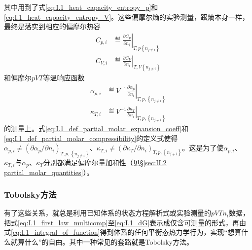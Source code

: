 \documentclass[main.tex]{subfiles}
\begin{document}
其中用到了式\eqref{eq:I.1_heat_capacity_entropy_p}和\eqref{eq:I.1_heat_capacity_entropy_V}。这些偏摩尔熵的实验测量，跟熵本身一样，最终是落实到相应的偏摩尔热容
\begin{align}
    C_{p,i} & \eqdef\left.\frac{\partial C_p}{\partial n_i}\right|_{T,p\left\{n_{j\neq i}\right\}} \label{eq:I.1_def_Cpi} \\
    C_{V,i} & \eqdef\left.\frac{\partial C_V}{\partial n_i}\right|_{T,V\left\{n_{j\neq i}\right\}}\label{eq:I.1_def_CVi}
\end{align}
和偏摩尔$pVT$等温响应函数
\begin{align}
    \alpha_{p,i} & \eqdef V^{-1}\left.\frac{\partial \alpha_p}{\partial n_i}\right|_{T,p,\left\{n_{j\neq i}\right\}}\label{eq:I.1_def_partial_molar_expansion_coeff} \\
    \kappa_{T,i} & \eqdef V^{-1}\left.\frac{\partial \kappa_T}{\partial n_i}\right|_{T,p,\left\{n_{j\neq i}\right\}}\label{eq:I.1_def_partial_molar_compressibility}
\end{align}
的测量上。式\eqref{eq:I.1_def_partial_molar_expansion_coeff}和\eqref{eq:I.1_def_partial_molar_compressibility}的定义式使得$\alpha_{p,i}\neq\left(\partial\alpha_p/\partial n_i\right)_{T,p,\left\{n_{j\neq i}\right\}}$、$\kappa_{T,i}\neq\left(\partial\kappa_T/\partial n_i\right)_{T,p,\left\{n_{j\neq i}\right\}}$。这是为了使$\alpha_{p,i}$、$\kappa_{T,i}$与$\alpha_p$、$\kappa_T$分别都满足偏摩尔量加和性（见\S\ref{sec:II.2 partial_molar_quantities}）。

\subsubsection{Tobolsky方法}
有了这些关系，就总是利用已知体系的状态方程解析式或实验测量的$pVTn_i$数据，把式\eqref{eq:I.1_first_law_multicomp}至\eqref{eq:I.1_dG}表示成仅含可测量的形式，再由式\eqref{eq:I.1_integral_of_function}得到体系的任何平衡态热力学行为，实现“想算什么就算什么”的自由。其中一种常见的套路就是Tobolsky方法。
\end{document}
